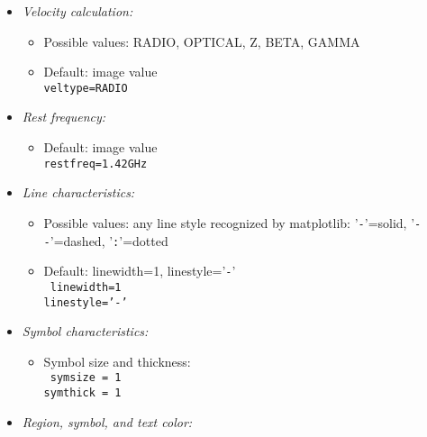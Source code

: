 \begin{itemize}
\begin{itemize}
{\tt corr=[X, Y]}

\end{itemize}



\item {\it Velocity calculation:}

\begin{itemize}

\item Possible values: RADIO, OPTICAL, Z, BETA, GAMMA
\item Default: image value\\

{\tt veltype=RADIO}

\end{itemize}

\item {\it Rest frequency:}

\begin{itemize}
\item Default: image value\\

{\tt restfreq=1.42GHz}

\end{itemize}

\item {\it Line characteristics:}

\begin{itemize}
\item Possible values: any line style recognized by matplotlib: '\verb=-='=solid, '\verb=--='=dashed, '\verb=:='=dotted
\item Default: linewidth=1, linestyle='\verb=-='\\

{\tt 
linewidth=1\\
linestyle='-'\\
}

\end{itemize}



\item {\it Symbol characteristics:}

\begin{itemize}
\item Symbol size and thickness:\\

{\tt 
symsize = 1\\ 
symthick = 1
}
\end{itemize}

\item {\it Region, symbol, and text color:}
\begin{itemize}


\end{itemize}
\end{itemize}
